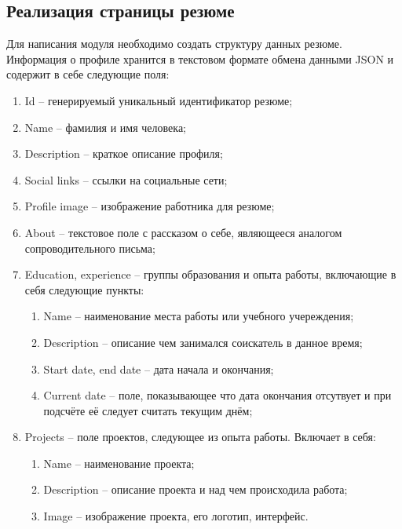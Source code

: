 \documentclass[master, och, diploma]{SCWorks}
\begin{document}
\subsection{Реализация страницы резюме}
Для написания модуля необходимо создать структуру данных резюме. Информация о профиле хранится в текстовом формате обмена данными JSON и содержит в себе следующие поля:
\begin{enumerate}
    \item Id -- генерируемый уникальный идентификатор резюме;
    \item Name -- фамилия и имя человека;
    \item Description -- краткое описание профиля;
    \item Social links -- ссылки на социальные сети;
    \item Profile image -- изображение работника для резюме;
    \item About -- текстовое поле с рассказом о себе, являющееся аналогом сопроводительного письма;
    \item Education, experience -- группы образования и опыта работы, включающие в себя следующие пункты:
    \begin{enumerate}
        \item Name -- наименование места работы или учебного учереждения;
        \item Description -- описание чем занимался соискатель в данное время;
        \item Start date, end date -- дата начала и окончания; 
        \item Current date -- поле, показывающее что дата окончания отсутвует и при подсчёте её следует считать текущим днём;
    \end{enumerate}
    \item Projects -- поле проектов, следующее из опыта работы. Включает в себя:
    \begin{enumerate}
        \item Name -- наименование проекта;
        \item Description -- описание проекта и над чем происходила работа;
        \item Image -- изображение проекта, его логотип, интерфейс.
    \end{enumerate}
\end{enumerate}
\end{document}
